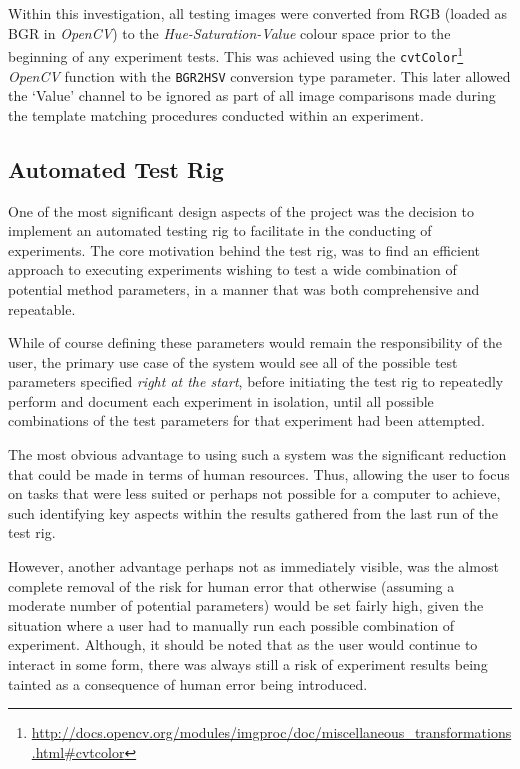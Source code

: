 Within this investigation, all testing images were converted from RGB (loaded as BGR in \textit{OpenCV}) to the \textit{Hue-Saturation-Value} colour space prior to the beginning of any experiment tests. This was achieved using the \texttt{cvtColor}\footnote{\url{http://docs.opencv.org/modules/imgproc/doc/miscellaneous_transformations.html#cvtcolor}} \textit{OpenCV} function with the \texttt{BGR2HSV} conversion type parameter. This later allowed the `Value' channel to be ignored as part of all image comparisons made during the template matching procedures conducted within an experiment.


\subsection{Automated Test Rig}

One of the most significant design aspects of the project was the decision to implement an automated testing rig to facilitate in the conducting of experiments. The core motivation behind the test rig, was to find an efficient approach to executing experiments wishing to test a wide combination of potential method parameters, in a manner that was both comprehensive and repeatable. 

While of course defining these parameters would remain the responsibility of the user, the primary use case of the system would see all of the possible test parameters specified \textit{right at the start}, before initiating the test rig to repeatedly perform and document each experiment in isolation, until all possible combinations of the test parameters for that experiment had been attempted. 

The most obvious advantage to using such a system was the significant reduction that could be made in terms of human resources. Thus, allowing the user to focus on tasks that were less suited or perhaps not possible for a computer to achieve, such identifying key aspects within the results gathered from the last run of the test rig. 

However, another advantage perhaps not as immediately visible, was the almost complete removal of the risk for human error that otherwise (assuming a moderate number of potential parameters) would be set fairly high, given the situation where a user had to manually run each possible combination of experiment. Although, it should be noted that as the user would continue to interact in some form, there was always still a risk of experiment results being tainted as a consequence of human error being introduced. 

